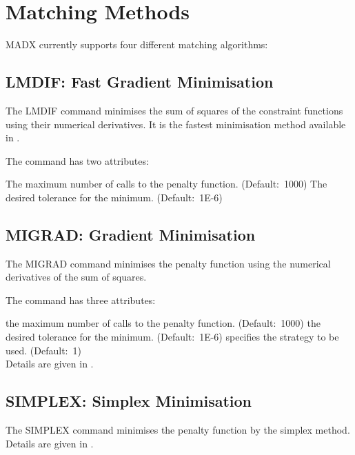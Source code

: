 

%

\section{Matching Methods}
\label{sec:match_methods}

MADX currently supports four different matching algorithms: 

\subsection{LMDIF: Fast Gradient Minimisation}
\label{subsec:match_lmdif}
The LMDIF command minimises the sum of squares of the constraint
functions using their numerical derivatives. It is the fastest
minimisation method available in \madx.    
 

The command has two attributes:  
\begin{madlist}
    The maximum number of calls to the penalty
   function. (Default:~1000) 
    The desired tolerance for the minimum. 
   (Default:~1E-6)  
\end{madlist}

\subsection{MIGRAD: Gradient Minimisation}
\label{subsec:match_migrad}
The MIGRAD command minimises the penalty function using the numerical
derivatives of the sum of squares.  


The command has three attributes: 
\begin{madlist}
    the maximum number of calls to the penalty
   function. (Default:~1000) 
    the desired tolerance for the minimum. 
   (Default:~1E-6)
    specifies the strategy to be used. (Default:~1) \\
   Details are given in \cite{MINUIT}.  
\end{madlist} 

\subsection{SIMPLEX: Simplex Minimisation}
\label{subsec:match_simplex}
The SIMPLEX command minimises the penalty function by the simplex
method. Details are given in \cite{MINUIT}.

